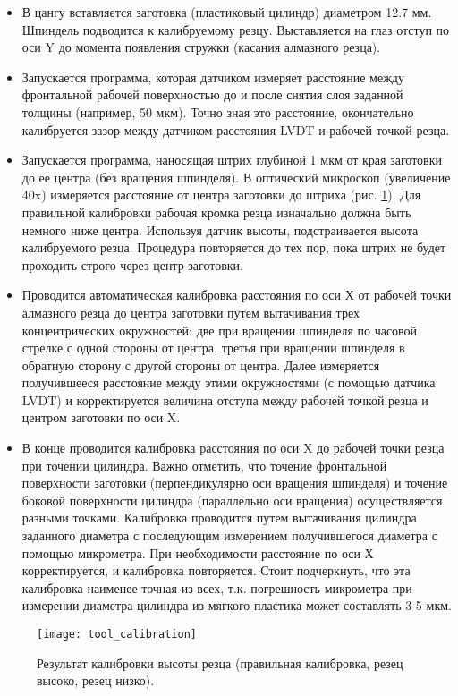 \begin{itemize}
    \item В цангу вставляется заготовка (пластиковый цилиндр) диаметром 12.7 мм. Шпиндель подводится к калибруемому резцу. Выставляется на глаз отступ по оси Y до момента появления стружки (касания алмазного резца).
    \item Запускается программа, которая датчиком измеряет расстояние между фронтальной рабочей поверхностью до и после снятия слоя заданной толщины (например, 50 мкм). Точно зная это расстояние, окончательно калибруется зазор между датчиком расстояния LVDT и рабочей точкой резца.
    \item Запускается программа, наносящая штрих глубиной 1 мкм от края заготовки до ее центра (без вращения шпинделя). В оптический микроскоп (увеличение 40x) измеряется расстояние от центра заготовки до штриха (рис. \ref{tool_calibration}). Для правильной калибровки рабочая кромка резца изначально должна быть немного ниже центра. Используя датчик высоты, подстраивается высота калибруемого резца. Процедура повторяется до тех пор, пока штрих не будет проходить строго через центр заготовки.
    \item Проводится автоматическая калибровка расстояния по оси Х от рабочей точки алмазного резца до центра заготовки путем вытачивания трех концентрических окружностей: две при вращении шпинделя по часовой стрелке с одной стороны от центра, третья при вращении шпинделя в обратную сторону с другой стороны от центра. Далее измеряется получившееся расстояние между этими окружностями (с помощью датчика LVDT) и корректируется величина отступа между рабочей точкой резца и центром заготовки по оси X.
    \item В конце проводится калибровка расстояния по оси X до рабочей точки резца при точении цилиндра. Важно отметить, что точение фронтальной поверхности заготовки (перпендикулярно оси вращения шпинделя) и точение боковой поверхности цилиндра (параллельно оси вращения) осуществляется разными точками. Калибровка проводится путем вытачивания цилиндра заданного диаметра с последующим измерением получившегося диаметра с помощью микрометра. При необходимости расстояние по оси Х корректируется, и калибровка повторяется. Стоит подчеркнуть, что эта калибровка наименее точная из всех, т.к. погрешность микрометра при измерении диаметра цилиндра из мягкого пластика может составлять 3-5 мкм.
\end{itemize}


\begin{figure}[ht]
    \centering
  \texttt{[image: tool\_calibration]}
  \caption{Результат калибровки высоты резца (правильная калибровка, резец высоко, резец низко).}
  \label{tool_calibration}
\end{figure}

